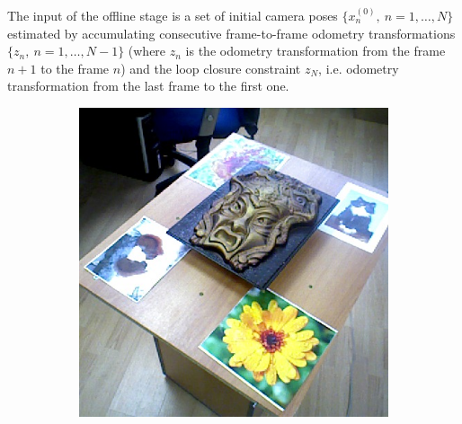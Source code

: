 \documentclass[letterpaper, 10 pt, conference]{ieeeconf}  %
\begin{document}
The input of the offline stage is a set of initial camera poses $\{x_n^{(0)},~n=1,\dots, N\}$ 
estimated by accumulating consecutive frame-to-frame odometry transformations 
$\{z_n,~n=1,\dots, N-1\}$  
(where $z_n$ is the odometry transformation from the frame $n+1$ to the frame $n$)
and the loop closure constraint $z_{N}$, 
i.e. odometry transformation from the last frame to the first one.

\begin{figure}[t]
	\centering
        \begin{subfigure}[b]{0.45\linewidth}
                \centering
                \includegraphics[width=\linewidth]{../models/gorgon_train.jpg}
                \caption{}
        \end{subfigure}%
        ~ %
        \begin{subfigure}[b]{0.45\linewidth}
                \centering

\end{subfigure}
\end{figure}
\end{document}
